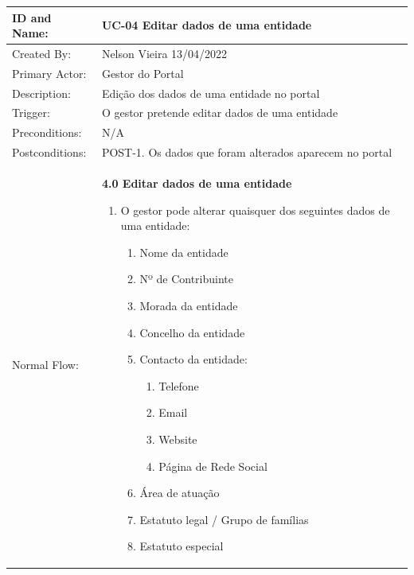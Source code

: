 \documentclass{scrreprt}
\begin{document}
\begin{table}[H]
    \centering
    \begin{adjustbox}{width=1.1\textwidth,center=\textwidth}
        \begin{tabular}{|m{4cm}|m{12cm}|}
            \hline
            ID and Name: & UC-04 Editar dados de uma entidade \\
            \hline
            Created By: & Nelson Vieira 13/04/2022 \\
            \hline
            Primary Actor: & Gestor do Portal \\
            \hline
            Description: & Edição dos dados de uma entidade no portal \\
            \hline
            Trigger: & O gestor pretende editar dados de uma entidade \\
            \hline
            Preconditions: & N/A \\
            \hline
            Postconditions: & POST-1. Os dados que foram alterados aparecem no portal \\
            \hline
            Normal Flow: & \textbf{4.0 Editar dados de uma entidade}
            \begin{enumerate}
                \item O gestor pode alterar quaisquer dos seguintes dados de uma entidade:
                \begin{enumerate}
                    \item Nome da entidade
                    \item Nº de Contribuinte
                    \item Morada da entidade
                    \item Concelho da entidade
                    \item Contacto da entidade:
                    \begin{enumerate}
                        \item Telefone
                        \item Email
                        \item Website
                        \item Página de Rede Social
                    \end{enumerate}
                    \item Área de atuação
                    \item Estatuto legal / Grupo de famílias
                    \item Estatuto especial

\end{enumerate}
\end{enumerate}
\end{tabular}
\end{adjustbox}
\end{table}
\end{document}
